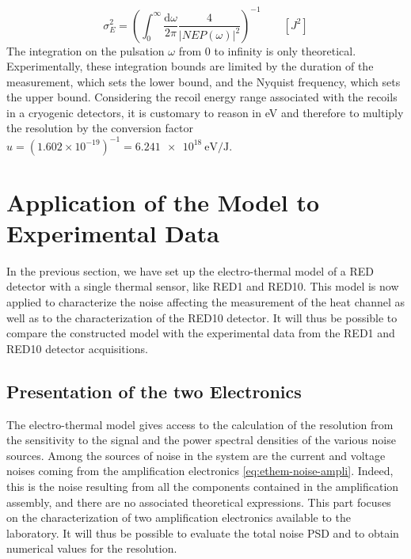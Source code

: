 \begin{equation}
\label{eq:resolution}
\displaystyle{ \sigma_E^2 = \left( \int_{0}^{\infty} \frac{\mathrm{d}\omega}{2\pi}\frac{4}{|NEP(\omega)|^2}\right)^{-1} } \qquad [J^2]
\end{equation}
The integration on the pulsation $\omega$ from $0$ to infinity is only theoretical. Experimentally, these integration bounds are limited by the duration of the measurement, which sets the lower bound, and the Nyquist frequency, which sets the upper bound. 
Considering the recoil energy range associated with the recoils in a cryogenic detectors, it is customary to reason in \si{eV} and therefore to multiply the resolution by the conversion factor $u=(1.602\times 10^{-19})^{-1} = \SI{6.241e18}{\eV\per\joule}$.


\section{Application of the Model to Experimental Data}

In the previous section, we have set up the electro-thermal model of a RED detector with a single thermal sensor, like RED1 and RED10. This model is now applied to characterize the noise affecting the measurement of the heat channel as well as to the characterization of the RED10 detector. It will thus be possible to compare the constructed model with the experimental data from the RED1 and RED10 detector acquisitions.

\subsection{Presentation of the two Electronics}

 The electro-thermal model gives access to the calculation of the resolution from the sensitivity to the signal and the power spectral densities of the various noise sources. Among the sources of noise in the system are the current and voltage noises coming from the amplification electronics \ref{eq:ethem-noise-ampli}. Indeed, this is the noise resulting from all the components contained in the amplification assembly, and there are no associated theoretical expressions. This part focuses on the characterization of two amplification electronics available to the laboratory. It will thus be possible to evaluate the total noise PSD and to obtain numerical values for the resolution.


